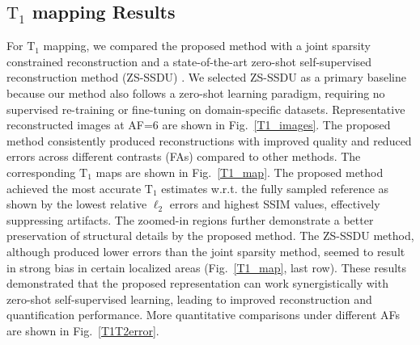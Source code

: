 \documentclass[journal,twoside,web]{ieeecolor}
\begin{document}
\subsection{$\text{T}_1$ mapping Results}
For $\text{T}_1$ mapping, we compared the proposed method with a joint sparsity constrained reconstruction \cite{majumdar2011accelerating} and a state-of-the-art zero-shot self-supervised reconstruction method (ZS-SSDU) \cite{yaman2022zero}. We selected ZS-SSDU as a primary baseline because our method also follows a zero-shot learning paradigm, requiring no supervised re-training or fine-tuning on domain-specific datasets. Representative reconstructed images at AF=6 are shown in Fig.~\ref{T1_images}. The proposed method consistently produced reconstructions with improved quality and reduced errors across different contrasts (FAs) compared to other methods. The corresponding $\text{T}_1$ maps are shown in Fig.~\ref{T1_map}. The proposed method achieved the most accurate $\text{T}_1$ estimates w.r.t. the fully sampled reference as shown by the lowest relative $\ell_2$ errors and highest SSIM values, effectively suppressing artifacts. The zoomed-in regions further demonstrate a better preservation of structural details by the proposed method. The ZS-SSDU method, although produced lower errors than the joint sparsity method, seemed to result in strong bias in certain localized areas (Fig.~\ref{T1_map}, last row). These results demonstrated that the proposed representation can work synergistically with zero-shot self-supervised learning, leading to improved reconstruction and quantification performance. More quantitative comparisons under different AFs are shown in Fig.~\ref{T1T2error}.
\end{document}
